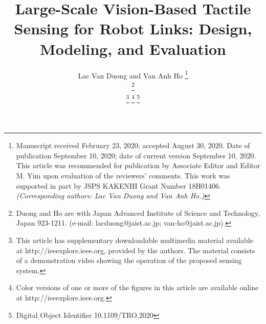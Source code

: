 \documentclass[10pt,letterpaper,journal,final,twoside,twocolumn,nofonttune]{IEEEtran}
\begin{document}
\title{Large-Scale Vision-Based Tactile Sensing for Robot Links: Design, Modeling, and Evaluation}
\author{Lac Van Duong and Van Anh Ho
\thanks{Manuscript received February 23, 2020; accepted August 30, 2020. Date of publication September 10, 2020; date of current version September 10, 2020. This article was recommended for publication by Associate Editor and Editor M. Yim upon evaluation of the reviewers’ comments. This work was supported in part by JSPS KAKENHI Grant Number 18H01406. \textit{(Corresponding authors: Lac Van Duong and Van Anh Ho.)} } 

\thanks{Duong and Ho are with Japan Advanced Institute of Science and Technology, Japan 923-1211. (e-mail: lacduong@jaist.ac.jp; van-ho@jaist.ac.jp).}

\thanks{This article has supplementary downloadable multimedia material available at http://ieeexplore.ieee.org, provided by the authors. The material consists of a demonstration video showing the operation of the proposed sensing system.}
\thanks{Color versions of one or more of the figures in this article are available online
at http://ieeexplore.ieee.org.}
\thanks{Digital Object Identifier 10.1109/TRO.2020}
}
\end{document}
